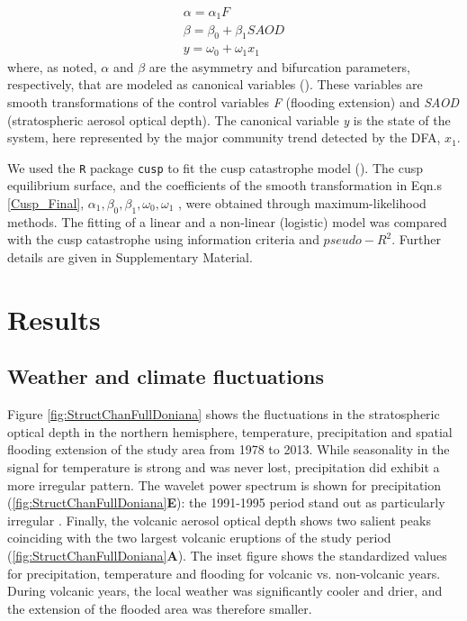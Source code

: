 \documentclass[12pt]{article}
\begin{document}
\begin{equation}\label{Cusp_Final}
	\begin{aligned}
		\alpha = \alpha_{1}F \\
		\beta = \beta_{0} + \beta_{1}SAOD \\
		y = \omega_{0} + \omega_{1}x_{1}
	\end{aligned}
\end{equation}
where, as noted, $\alpha$ and $\beta$ are the asymmetry and bifurcation parameters, respectively, that are modeled as canonical variables (\cite{Grasman2009}). These variables are smooth transformations of the control variables \textit{F} (flooding extension) and \textit{SAOD} (stratospheric aerosol optical depth). The canonical variable \textit{y} is the state of the system, here represented by the major community trend detected by the DFA, $x_{1}$.

We used the \verb|R| package \verb|cusp| to fit the cusp catastrophe model (\cite{Grasman2009}). The cusp equilibrium surface, and the coefficients of the smooth transformation in Eqn.s \ref{Cusp_Final}, $ \alpha_{1}, \beta_{0}, \beta_{1}, \omega_{0}, \omega_{1}  $ , were obtained through maximum-likelihood methods. The fitting of a linear and a non-linear (logistic) model was compared with the cusp catastrophe using information criteria and $ pseudo-R^{2} $. Further details are given in Supplementary Material. \\

\section*{Results}
\label{sec:Results}

\subsection*{Weather and climate fluctuations}
\label{subsec:WeathRes}

Figure \ref{fig:StructChanFullDoniana} shows the fluctuations in the stratospheric optical depth in the northern hemisphere, temperature, precipitation and spatial flooding extension of the study area from 1978 to 2013. While seasonality in the signal for temperature is strong and was never lost, precipitation did exhibit a more irregular pattern. The wavelet power spectrum is shown for precipitation (\ref{fig:StructChanFullDoniana}\textbf{E}): the 1991-1995 period stand out as particularly irregular . Finally, the volcanic aerosol optical depth shows two salient peaks coinciding with the two largest volcanic eruptions of the study period (\ref{fig:StructChanFullDoniana}\textbf{A}). The inset figure shows the standardized values for precipitation, temperature and flooding for volcanic vs. non-volcanic years. During volcanic years, the local weather was significantly cooler and drier, and the extension of the flooded area was therefore  smaller.
\end{document}
